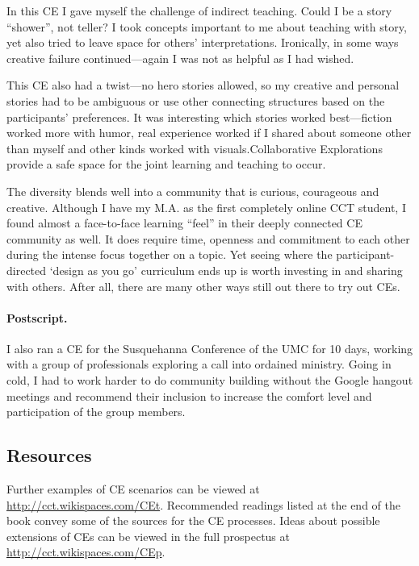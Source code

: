 In this CE I gave myself the challenge of indirect teaching. Could I be
a story ``shower'', not teller? I took concepts important to me about
teaching with story, yet also tried to leave space for others'
interpretations. Ironically, in some ways creative failure
continued---again I was not as helpful as I had wished. 

This CE also had
a twist---no hero stories allowed, so my creative and personal stories
had to be ambiguous or use other connecting structures based on the
participants' preferences. It was interesting which stories worked
best---fiction worked more with humor, real experience worked if I
shared about someone other than myself and other kinds worked with
visuals.Collaborative Explorations provide a safe space for the joint
learning and teaching to occur. 

The diversity blends well into a
community that is curious, courageous and creative. Although I have my
M.A. as the first completely online CCT student, I found almost a
face-to-face learning ``feel'' in their deeply connected CE community as
well. It does require time, openness and commitment to each other during
the intense focus together on a topic. Yet seeing where the
participant-directed `design as you go' curriculum ends up is worth
investing in and sharing with others. After all, there are many other
ways still out there to try out CEs.

\paragraph{Postscript.}

I also ran a CE for the Susquehanna Conference of the UMC for 10 days,
working with a group of professionals exploring a call into ordained
ministry. Going in cold, I had to work harder to do community building
without the Google hangout meetings and recommend their inclusion to
increase the comfort level and participation of the group members.

\subsection{Resources}

Further examples of CE scenarios can be viewed at
\href{http://cct.wikispaces.com/CEt}{http://cct.wikispaces.com/CEt}.
Recommended readings listed at the end of the book convey some of the
sources for the CE processes. Ideas about possible extensions of CEs
can be viewed in the full prospectus at
\href{http://cct.wikispaces.com/CEp}{http://cct.wikispaces.com/CEp}.

